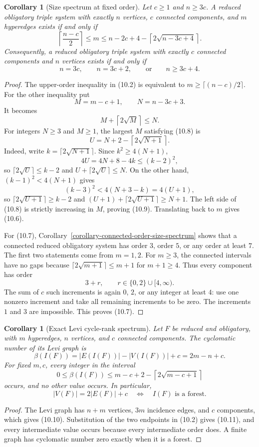 \documentclass[a4paper,11pt,reqno]{amsart}
\theoremstyle{plain}
\newtheorem{corollary}[theorem]{Corollary}
\theoremstyle{definition}
\theoremstyle{remark}
\begin{document}
\begin{corollary}[Size spectrum at fixed order]
\label{corollary-fixed-order-size-spectrum}
Let $c\ge1$ and $n\ge3c$.  A reduced obligatory triple system with exactly
$n$ vertices, $c$ connected components, and $m$ hyperedges exists if and only
if
\[
\boxed{
\left\lceil\frac{n-c}{2}\right\rceil
\le m\le
n-2c+4-\left\lceil2\sqrt{n-3c+4}\right\rceil.
}
\tag{10.6}
\]
Consequently, a reduced obligatory triple system with exactly $c$ connected
components and $n$ vertices exists if and only if
\[
n=3c,\qquad n=3c+2,\qquad\text{or}\qquad n\ge3c+4.
\tag{10.7}
\]
\end{corollary}
\begin{proof}
The upper-order inequality in (10.2) is equivalent to
$m\ge\lceil(n-c)/2\rceil$.  For the other inequality put
\[
M=m-c+1,\qquad N=n-3c+3.
\]
It becomes
\[
M+\left\lceil2\sqrt M\right\rceil\le N.
\tag{10.8}
\]
For integers $N\ge3$ and $M\ge1$, the largest $M$ satisfying (10.8) is
\[
U=N+2-\left\lceil2\sqrt{N+1}\right\rceil.
\tag{10.9}
\]
Indeed, write $k=\lceil2\sqrt{N+1}\rceil$.  Since
$k^2\ge4(N+1)$,
\[
4U=4N+8-4k\le(k-2)^2,
\]
so $\lceil2\sqrt U\rceil\le k-2$ and
$U+\lceil2\sqrt U\rceil\le N$.  On the other hand,
$(k-1)^2<4(N+1)$ gives
\[
(k-3)^2<4(N+3-k)=4(U+1),
\]
so $\lceil2\sqrt{U+1}\rceil\ge k-2$ and
$(U+1)+\lceil2\sqrt{U+1}\rceil\ge N+1$.  The left side of (10.8) is
strictly increasing in $M$, proving (10.9).  Translating back to $m$ gives
(10.6).

For (10.7), Corollary~\ref{corollary-connected-order-size-spectrum} shows that
a connected reduced obligatory system has order $3$, order $5$, or any order
at least $7$.  The first two statements come from $m=1,2$.  For $m\ge3$, the
connected intervals have no gaps because
$\lceil2\sqrt{m+1}\rceil\le m+1$ for $m+1\ge4$.  Thus every component has
order
\[
3+r,\qquad r\in\{0,2\}\cup[4,\infty).
\]
The sum of $c$ such increments is again $0$, $2$, or any integer at least
$4$: use one nonzero increment and take all remaining increments to be zero.
The increments $1$ and $3$ are impossible.  This proves (10.7).
\end{proof}

\begin{corollary}[Exact Levi cycle-rank spectrum]
\label{corollary-levi-cycle-rank-spectrum}
Let $F$ be reduced and obligatory, with $m$ hyperedges, $n$ vertices, and $c$
connected components.  The cyclomatic number of its Levi graph is
\[
\beta(I(F))=|E(I(F))|-|V(I(F))|+c=2m-n+c.
\tag{10.10}
\]
For fixed $m,c$, every integer in the interval
\[
0\le\beta(I(F))\le
m-c+2-\left\lceil2\sqrt{m-c+1}\right\rceil
\tag{10.11}
\]
occurs, and no other value occurs.  In particular,
\[
|V(F)|=2|E(F)|+c
\quad\Longleftrightarrow\quad
I(F)\text{ is a forest}.
\]
\end{corollary}
\begin{proof}
The Levi graph has $n+m$ vertices, $3m$ incidence edges, and $c$ components,
which gives (10.10).  Substitution of the two endpoints in (10.2) gives
(10.11), and every intermediate value occurs because every intermediate order
does.  A finite graph has cyclomatic number zero exactly when it is a forest.
\end{proof}
\end{document}
